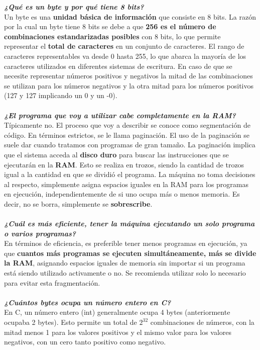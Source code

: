 \documentclass{templateNote}
\begin{document}
\noindent \textit{\textbf{¿Qué es un byte y por qué tiene 8 bits?}} \\
Un byte es una \textbf{unidad básica de información} que consiste en 8 bits. La razón por la cual un byte tiene 8 bits se debe a que 
\textbf{256 es el número de combinaciones estandarizadas posibles} con 8 bits, lo que permite representar el \textbf{total de caracteres} en 
un conjunto de caracteres. El rango de caracteres representables va desde 0 hasta 255, lo que abarca la mayoría de los caracteres 
utilizados en diferentes sistemas de escritura. En caso de que se necesite representar números positivos y negativos la mitad de 
las combinaciones se utilizan para los números negativos y la otra mitad para los números positivos (127 y 127 implicando un 0 y un -0).
\\\\
\noindent \textit{\textbf{¿El programa que voy a utilizar cabe completamente en la RAM?}} \\
Típicamente no. El proceso que voy a describir se conoce como segmentación de código. En términos estrictos, se le llama paginación. 
El uso de la paginación se suele dar cuando tratamos con programas de gran tamaño.
La paginación implica que el sistema acceda al \textbf{disco duro} para buscar las instrucciones que se ejecutarán en la \textbf{RAM}. Esto se realiza 
en trozos, siendo la cantidad de trozos igual a la cantidad en que se dividió el programa. La máquina no toma decisiones al respecto, 
simplemente asigna espacios iguales en la RAM para los programas en ejecución, independientemente de si uno ocupa más o menos memoria. 
Es decir, no se borra, simplemente se \textbf{sobrescribe}.
\\\\
\noindent \textit{\textbf{¿Cuál es más eficiente, tener la máquina ejecutando un solo programa o varios programas?}}\\
En términos de eficiencia, es preferible tener menos programas en ejecución, ya que \textbf{cuantos más programas se ejecuten simultáneamente, más se divide la RAM}, 
asignando espacios iguales de memoria sin importar si un programa está siendo utilizado activamente o no. Se recomienda utilizar solo lo necesario para evitar
esta fragmentación.
\\\\
\noindent \textit{\textbf{¿Cuántos bytes ocupa un número entero en C?}}\\
En C, un número entero (int) generalmente ocupa 4 bytes (anteriormente ocupaba 2 bytes). Esto permite un total de $2^{32}$ combinaciones de números, con la mitad 
menos 1 para los valores positivos y el mismo valor para los valores negativos, con un cero tanto positivo como negativo.
\newpage
\end{document}
